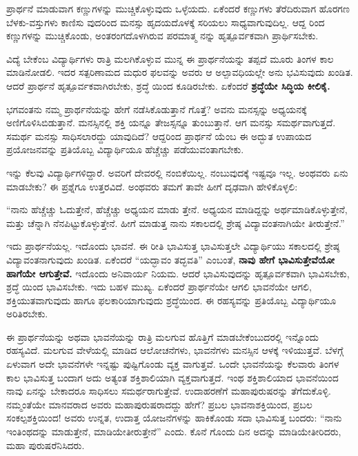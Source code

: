 ಪ್ರಾರ್ಥನೆ ಮಾಡುವಾಗ ಕಣ್ಣುಗಳನ್ನು ಮುಚ್ಚಿಕೊಳ್ಳುವುದು ಒಳ್ಳೆಯದು. ಏಕೆಂದರೆ ಕಣ್ಣುಗಳು ತೆರೆದಿರುವಾಗ ಹೊರಗಣ ಬೆಳಕು-ವಸ್ತುಗಳು ಕಾಣಿಸು ವುದರಿಂದ ಮನಸ್ಸು ಹೃದಯದೊಳಕ್ಕೆ ಸರಿಯಲು ಸಾಧ್ಯವಾಗುವುದಿಲ್ಲ. ಆದ್ದ ರಿಂದ ಕಣ್ಣುಗಳನ್ನು ಮುಚ್ಚಿಕೊಂಡು, ಅಂತರಂಗದೊಳಗಿರುವ ಪರಮಾತ್ಮ ನನ್ನು ಹೃತ್ಪೂರ್ವಕವಾಗಿ ಪ್ರಾರ್ಥಿಸಬೇಕು.

ವಿದ್ಯೆ ಬೇಕೆಂಬ ವಿದ್ಯಾರ್ಥಿಗಳು ರಾತ್ರಿ ಮಲಗಿಕೊಳ್ಳುವ ಮುನ್ನ ಈ ಪ್ರಾರ್ಥನೆಯನ್ನು ತಪ್ಪದೆ ಮೂರು ತಿಂಗಳ ಕಾಲ ಮಾಡಿನೋಡಲಿ. ಇದರ ಸತ್ಪರಿಣಾಮದ ಮಧುರ ಫಲವನ್ನು ಅವರು ಆ ಅಲ್ಪಾವಧಿಯಲ್ಲೇ ಅನು ಭವಿಸುವುದು ಖಂಡಿತ. ಆದರೆ ಪ್ರಾರ್ಥನೆ ಹೃತ್ಪೂರ್ವಕವಾಗಿರಬೇಕು, ಶ್ರದ್ಧೆ ಯಿಂದ ಕೂಡಿರಬೇಕು. ಏಕೆಂದರೆ \textbf{ಶ್ರದ್ಧೆಯೇ ಸಿದ್ಧಿಯ ಕೀಲಿಕೈ.}

ಭಗವಂತನು ನಮ್ಮ ಪ್ರಾರ್ಥನೆಯನ್ನು ಹೇಗೆ ನಡೆಸಿಕೊಡುತ್ತಾನೆ ಗೊತ್ತೆ? ಅವನು ಮನಸ್ಸನ್ನು ಅಧ್ಯಯನಕ್ಕೆ ಅಣಿಗೊಳಿಸಿಬಿಡುತ್ತಾನೆ. ಮನಸ್ಸಿನಲ್ಲಿ ಶಕ್ತಿ ಯನ್ನೂ ತೇಜಸ್ಸನ್ನೂ ತುಂಬುತ್ತಾನೆ. ಆಗ ಮನಸ್ಸು ಸಮರ್ಥವಾಗುತ್ತದೆ. ಸಮರ್ಥ ಮನಸ್ಸು ಸಾಧಿಸಲಾರದ್ದು ಯಾವುದಿದೆ? ಆದ್ದರಿಂದ ಪ್ರಾರ್ಥನೆ ಯೆಂಬ ಈ ಅದ್ಭುತ ಉಪಾಯದ ಪ್ರಯೋಜನವನ್ನು ಪ್ರತಿಯೊಬ್ಬ ವಿದ್ಯಾರ್ಥಿಯೂ ಹೆಚ್ಚೆಚ್ಚು ಪಡೆಯುವಂತಾಗಬೇಕು.

ಇನ್ನು ಕೆಲವು ವಿದ್ಯಾರ್ಥಿಗಳಿದ್ದಾರೆ. ಅವರಿಗೆ ದೇವರಲ್ಲಿ ನಂಬಿಕೆಯಿಲ್ಲ. ನಂಬುವುದಕ್ಕೆ ಇಷ್ಟವೂ ಇಲ್ಲ. ಅಂಥವರು ಏನು ಮಾಡಬೇಕು? ಈ ಪ್ರಶ್ನೆಗೂ ಉತ್ತರವಿದೆ. ಅಂಥವರು ತಮಗೆ ತಾವೇ ಹೀಗೆ ದೃಢವಾಗಿ ಹೇಳಿಕೊಳ್ಳಲಿ:

\begin{myquote}
“ನಾನು ಹೆಚ್ಚೆಚ್ಚು ಓದುತ್ತೇನೆ, ಹೆಚ್ಚೆಚ್ಚು ಅಧ್ಯಯನ ಮಾಡು ತ್ತೇನೆ. ಅಧ್ಯಯನ ಮಾಡಿದ್ದನ್ನು ಅರ್ಥಮಾಡಿಕೊಳ್ಳುತ್ತೇನೆ, ಮತ್ತು ಚೆನ್ನಾಗಿ ನೆನಪಿಟ್ಟುಕೊಳ್ಳುತ್ತೇನೆ. ಹೀಗೆ ಮಾಡುತ್ತ ನಾನು ಸಕಾಲದಲ್ಲಿ ಶ್ರೇಷ್ಠ ವಿದ್ಯಾವಂತನಾಗಿಯೇ ತೀರುತ್ತೇನೆ.”
\end{myquote}

ಇದು ಪ್ರಾರ್ಥನೆಯಲ್ಲ. ಇದೊಂದು ಭಾವನೆ. ಈ ರೀತಿ ಭಾವಿಸುತ್ತ ಭಾವಿಸುತ್ತಲೇ ವಿದ್ಯಾರ್ಥಿಯು ಸಕಾಲದಲ್ಲಿ ಶ್ರೇಷ್ಠ ವಿದ್ಯಾವಂತನಾಗುವುದು ಖಂಡಿತ. ಏಕೆಂದರೆ “ಯದ್ಭಾವಂ ತದ್ಭವತಿ” ಎಂಬಂತೆ, \textbf{ನಾವು ಹೇಗೆ ಭಾವಿಸುತ್ತೇವೆಯೋ ಹಾಗೆಯೇ ಆಗುತ್ತೇವೆ.} ಇದೊಂದು ಅನಿವಾರ್ಯ ನಿಯಮ. ಆದರೆ ಭಾವಿಸುವುದನ್ನು ಹೃತ್ಪೂರ್ವಕವಾಗಿ ಭಾವಿಸಬೇಕು, ಶ್ರದ್ಧೆ ಯಿಂದ ಭಾವಿಸಬೇಕು. ಇದು ಬಹಳ ಮುಖ್ಯ. ಏಕೆಂದರೆ ಪ್ರಾರ್ಥನೆಯೇ ಆಗಲಿ ಭಾವನೆಯೇ ಆಗಲಿ, ಶಕ್ತಿಯುತವಾಗುವುದು ಹಾಗೂ ಫಲಕಾರಿಯಾಗುವುದು ಶ್ರದ್ಧೆಯಿಂದ. ಈ ರಹಸ್ಯವನ್ನು ಪ್ರತಿಯೊಬ್ಬ ವಿದ್ಯಾರ್ಥಿಯೂ ಅರಿತಿರಬೇಕು.

ಈ ಪ್ರಾರ್ಥನೆಯನ್ನು ಅಥವಾ ಭಾವನೆಯನ್ನು ರಾತ್ರಿ ಮಲಗುವ ಹೊತ್ತಿಗೆ ಮಾಡಬೇಕೆಂಬುದರಲ್ಲಿ ಇನ್ನೊಂದು ರಹಸ್ಯವಿದೆ. ಮಲಗುವ ವೇಳೆಯಲ್ಲಿ ಮಾಡಿದ ಆಲೋಚನೆಗಳು, ಭಾವನೆಗಳು ಮನಸ್ಸಿನ ಆಳಕ್ಕೆ ಇಳಿಯುತ್ತವೆ. ಬೆಳಗ್ಗೆ ಏಳುವಾಗ ಅದೇ ಭಾವನೆಗಳೇ ಇನ್ನಷ್ಟು ಪುಷ್ಟಿಗೊಂಡು ವ್ಯಕ್ತ ವಾಗುತ್ತವೆ. ಒಂದೇ ಭಾವನೆಯನ್ನು ಕೆಲವಾರು ತಿಂಗಳ ಕಾಲ ಭಾವಿಸುತ್ತ ಬಂದಾಗ ಅದು ಅತ್ಯಂತ ಶಕ್ತಿಶಾಲಿಯಾಗಿ ವ್ಯಕ್ತವಾಗುತ್ತದೆ. ಇಂಥ ಶಕ್ತಿಶಾಲಿಯಾದ ಭಾವನೆಯಿಂದ ನಾವು ಏನನ್ನು ಬೇಕಾದರೂ ಸಾಧಿಸಲು ಸಮರ್ಥರಾಗುತ್ತೇವೆ. ಉದಾಹರಣೆಗೆ ಮಹಾಪುರುಷರನ್ನು ತೆಗೆದುಕೊಳ್ಳಿ. ನಮ್ಮಂತೆಯೇ ಮಾನವರಾದ ಅವರು ಮಹಾಪುರುಷರಾದದ್ದು ಹೇಗೆ? ಪ್ರಬಲ ಭಾವನಾಶಕ್ತಿಯಿಂದ, ಪ್ರಬಲ ಸಂಕಲ್ಪಶಕ್ತಿಯಿಂದ! ಅವರು ಉನ್ನತ, ಉದಾತ್ತ ಯೋಜನೆಗಳನ್ನು ಹಾಕಿಕೊಂಡು ಸದಾ ಭಾವಿಸುತ್ತ ಬಂದರು: “ನಾನು ಇಂತಿಂಥದನ್ನು ಮಾಡುತ್ತೇನೆ, ಮಾಡಿಯೇತೀರುತ್ತೇನೆ” ಎಂದು. ಕೊನೆ ಗೊಂದು ದಿನ ಅದನ್ನು ಮಾಡಿಯೇತೀರಿದರು, ಮಹಾ ಪುರುಷರೆನಿಸಿದರು.

